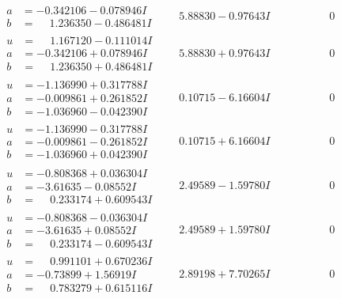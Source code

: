 \documentclass[1p]{elsarticle_modified}
\theoremstyle{definition}
\begin{document}
$$\begin{array}{c|c|c}
\begin{aligned}
a &= -0.342106 - 0.078946 I \\
b &= \phantom{-}1.236350 - 0.486481 I\end{aligned}
 & \phantom{-}5.88830 - 0.97643 I & \phantom{-0.000000 } 0 \\ \hline\begin{aligned}
u &= \phantom{-}1.167120 - 0.111014 I \\
a &= -0.342106 + 0.078946 I \\
b &= \phantom{-}1.236350 + 0.486481 I\end{aligned}
 & \phantom{-}5.88830 + 0.97643 I & \phantom{-0.000000 } 0 \\ \hline\begin{aligned}
u &= -1.136990 + 0.317788 I \\
a &= -0.009861 + 0.261852 I \\
b &= -1.036960 - 0.042390 I\end{aligned}
 & \phantom{-}0.10715 - 6.16604 I & \phantom{-0.000000 } 0 \\ \hline\begin{aligned}
u &= -1.136990 - 0.317788 I \\
a &= -0.009861 - 0.261852 I \\
b &= -1.036960 + 0.042390 I\end{aligned}
 & \phantom{-}0.10715 + 6.16604 I & \phantom{-0.000000 } 0 \\ \hline\begin{aligned}
u &= -0.808368 + 0.036304 I \\
a &= -3.61635 - 0.08552 I \\
b &= \phantom{-}0.233174 + 0.609543 I\end{aligned}
 & \phantom{-}2.49589 - 1.59780 I & \phantom{-0.000000 } 0 \\ \hline\begin{aligned}
u &= -0.808368 - 0.036304 I \\
a &= -3.61635 + 0.08552 I \\
b &= \phantom{-}0.233174 - 0.609543 I\end{aligned}
 & \phantom{-}2.49589 + 1.59780 I & \phantom{-0.000000 } 0 \\ \hline\begin{aligned}
u &= \phantom{-}0.991101 + 0.670236 I \\
a &= -0.73899 + 1.56919 I \\
b &= \phantom{-}0.783279 + 0.615116 I\end{aligned}
 & \phantom{-}2.89198 + 7.70265 I & \phantom{-0.000000 } 0 \\ \hline\begin{aligned}

\end{aligned}
\end{array}$$
\end{document}
